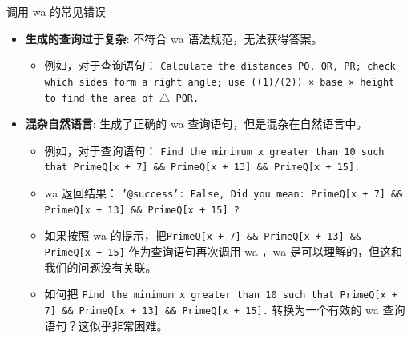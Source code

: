 \begin{frame}{调用 wa 的常见错误}
	\begin{itemize}
		\item \textbf{生成的查询过于复杂}: 不符合 wa 语法规范，无法获得答案。
		      \begin{itemize}
			      \item 例如，对于查询语句：
			            \texttt{Calculate the distances PQ, QR, PR; check which sides form a right angle; use ((1)/(2)) × base × height to find the area of $\triangle$ PQR.}
		      \end{itemize}
		      \pause
		      \bigskip
		\item \textbf{混杂自然语言}: 生成了正确的 wa 查询语句，但是混杂在自然语言中。
		      \begin{itemize}
			      \item 例如，对于查询语句：
			            \texttt{Find the minimum x greater than 10 such that PrimeQ[x + 7] \&\& PrimeQ[x + 13] \&\& PrimeQ[x + 15].}
			      \item wa 返回结果：
			            \texttt{'@success': False, Did you mean: PrimeQ[x + 7] \&\& PrimeQ[x + 13] \&\& PrimeQ[x + 15] ?}
			      \item  如果按照 wa 的提示，把\texttt{PrimeQ[x + 7] \&\& PrimeQ[x + 13] \&\& PrimeQ[x + 15]} 作为查询语句再次调用 wa ，wa 是可以理解的，但这和我们的问题没有关联。
			      \item 如何把 \texttt{Find the minimum x greater than 10 such that PrimeQ[x + 7] \&\& PrimeQ[x + 13] \&\& PrimeQ[x + 15].} 转换为一个有效的 wa 查询语句？这似乎非常困难。
		      \end{itemize}
	\end{itemize}
\end{frame}

